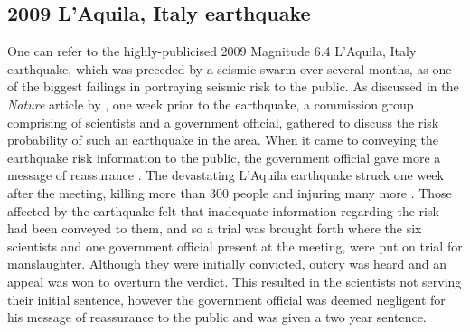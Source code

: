 \documentclass[12pt]{report}
\begin{document}
\subsection{2009 L'Aquila, Italy earthquake}
One can refer to the highly-publicised 2009 Magnitude 6.4 L'Aquila, Italy earthquake, which was preceded by a seismic swarm over several months, as one of the biggest failings in portraying seismic risk to the public. As discussed in the \textit{Nature} article by \citet{Hall2011}, one week prior to the earthquake, a commission group comprising of scientists and a government official, gathered to discuss the risk probability of such an earthquake in the area. When it came to conveying the earthquake risk information to the public, the government official gave more a message of reassurance \citep{Yeo2014}. The devastating L'Aquila earthquake struck one week after the meeting, killing more than 300 people and injuring many more \citep{Hall2011}. Those affected by the earthquake felt that inadequate information regarding the risk had been conveyed to them, and so a trial was brought forth where the six scientists and one government official present at the meeting, were put on trial for manslaughter. Although they were initially convicted, outcry was heard and an appeal was won to overturn the verdict. This resulted in the scientists not serving their initial sentence, however the government official was deemed negligent for his message of reassurance to the public and was given a two year sentence.

\end{document}
